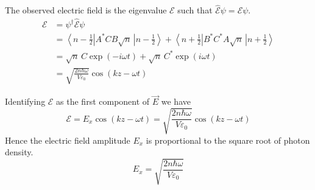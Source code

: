 \documentclass[12pt]{article}
\begin{document}
\noindent
The observed electric field is the eigenvalue $\mathscr{E}$ such that $\hat{\mathscr{E}}\psi=\mathscr{E}\psi$.
\begin{align*}
\mathscr{E}
&=\psi^\dagger\hat{\mathscr{E}}\psi\\
&=\left\langle n-\tfrac{1}{2}\right|A^*CB\sqrt{n}\,\left|n-\tfrac{1}{2}\right\rangle
+\left\langle n+\tfrac{1}{2}\right|B^*C^*A\sqrt{n}\,\left|n+\tfrac{1}{2}\right\rangle\\
&=\sqrt{n}\,C\exp(-i\omega t)+\sqrt{n}\,C^*\exp(i\omega t)\\
&=\sqrt{\frac{2n\hbar\omega}{V\varepsilon_0}}\cos(kz-\omega t)
\end{align*}

\noindent
Identifying $\mathscr{E}$ as the first component of $\vec{E}$ we have
$$
\mathscr{E}=E_x\cos(kz-\omega t)=\sqrt{\frac{2n\hbar\omega}{V\varepsilon_0}}\cos(kz-\omega t)
$$
Hence the electric field amplitude $E_x$ is proportional to the square root of photon density.
$$
E_x=\sqrt{\frac{2n\hbar\omega}{V\varepsilon_0}}
$$
\end{document}
